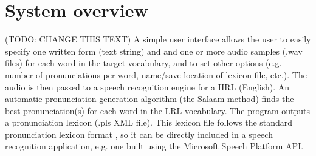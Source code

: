 \documentclass[11pt]{article}
\begin{document}
\section{System overview}
\label{sec:overview}
(TODO: CHANGE THIS TEXT)
A simple user interface allows the user to easily specify one written form (text string) and and one or more audio samples (.wav files) for each word in the target vocabulary, and to set other options (e.g. number of pronunciations per word, name/save location of lexicon file, etc.). The audio is then passed to a speech recognition engine for a HRL (English). An automatic pronunciation generation algorithm (the Salaam method) finds the best pronunciation(s) for each word in the LRL vocabulary. The program outputs a pronunciation lexicon (.pls XML file). This lexicon file follows the standard pronunciation lexicon format \cite{pls}, so it can be directly included in a speech recognition application, e.g. one built using the Microsoft Speech Platform API.
\end{document}
